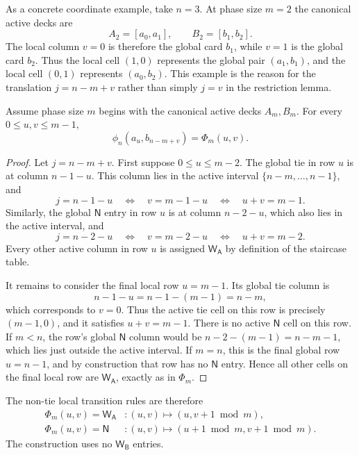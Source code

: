 \documentclass[12pt]{article}
\newcommand{\WA}{\mathsf{W_A}}
\newcommand{\WB}{\mathsf{W_B}}
\newcommand{\NN}{\mathsf{N}}
\begin{document}
As a concrete coordinate example, take $n=3$. At phase size $m=2$ the canonical active decks are
\[
A_2=[a_0,a_1],\qquad B_2=[b_1,b_2].
\]
The local column $v=0$ is therefore the global card $b_1$, while $v=1$ is the global card $b_2$. Thus the local cell $(1,0)$ represents the global pair $(a_1,b_1)$, and the local cell $(0,1)$ represents $(a_0,b_2)$. This example is the reason for the translation $j=n-m+v$ rather than simply $j=v$ in the restriction lemma.

\begin{lemma}\label{lem:restrict}
Assume phase size $m$ begins with the canonical active decks $A_m,B_m$. For every $0\le u,v\le m-1$,
\[
\phi_n(a_u,b_{n-m+v})=\Phi_m(u,v).
\]
\end{lemma}
\begin{proof}
Let $j=n-m+v$. First suppose $0\le u\le m-2$. The global tie in row $u$ is at column $n-1-u$. This column lies in the active interval $\{n-m,\dots,n-1\}$, and
\[
j=n-1-u \quad\Longleftrightarrow\quad v=m-1-u \quad\Longleftrightarrow\quad u+v=m-1.
\]
Similarly, the global $\NN$ entry in row $u$ is at column $n-2-u$, which also lies in the active interval, and
\[
j=n-2-u \quad\Longleftrightarrow\quad v=m-2-u \quad\Longleftrightarrow\quad u+v=m-2.
\]
Every other active column in row $u$ is assigned $\WA$ by definition of the staircase table.

It remains to consider the final local row $u=m-1$. Its global tie column is
\[
n-1-u=n-1-(m-1)=n-m,
\]
which corresponds to $v=0$. Thus the active tie cell on this row is precisely $(m-1,0)$, and it satisfies $u+v=m-1$. There is no active $\NN$ cell on this row. If $m<n$, the row's global $\NN$ column would be $n-2-(m-1)=n-m-1$, which lies just outside the active interval. If $m=n$, this is the final global row $u=n-1$, and by construction that row has no $\NN$ entry. Hence all other cells on the final local row are $\WA$, exactly as in $\Phi_m$.
\end{proof}

The non-tie local transition rules are therefore
\begin{align*}
\Phi_m(u,v)=\WA &: (u,v)\mapsto (u,v+1\bmod m),\\
\Phi_m(u,v)=\NN &: (u,v)\mapsto (u+1\bmod m,v+1\bmod m).
\end{align*}
The construction uses no $\WB$ entries.
\end{document}
